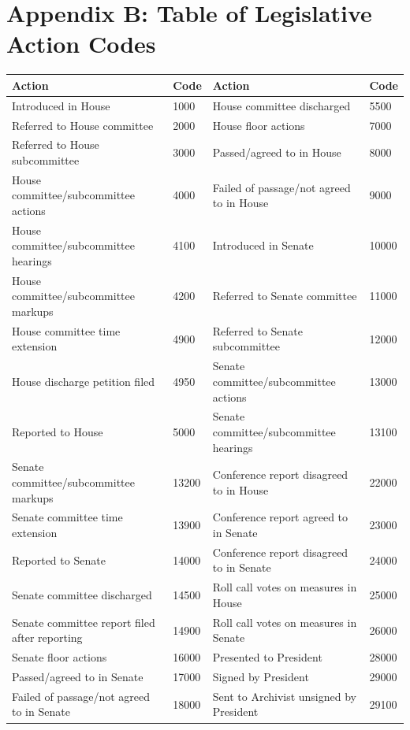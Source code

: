 \documentclass[letterpaper,11pt]{article}
\begin{document}
\clearpage

\section*{Appendix B: Table of Legislative Action Codes}\label{appendix:B}

\begin{table}[!h]
\centering
\footnotesize
\begin{tabular}{llll}
\hline
\textbf{Action} & \textbf{Code} & \textbf{Action} & \textbf{Code} \\
\hline
Introduced in House & 1000 & House committee discharged & 5500 \\
Referred to House committee & 2000 & House floor actions & 7000 \\
Referred to House subcommittee & 3000 & Passed/agreed to in House & 8000 \\
House committee/subcommittee actions & 4000 & Failed of passage/not agreed to in House & 9000 \\
House committee/subcommittee hearings & 4100 & Introduced in Senate & 10000 \\
House committee/subcommittee markups & 4200 & Referred to Senate committee & 11000 \\
House committee time extension & 4900 & Referred to Senate subcommittee & 12000 \\
House discharge petition filed & 4950 & Senate committee/subcommittee actions & 13000 \\
Reported to House & 5000 & Senate committee/subcommittee hearings & 13100 \\
Senate committee/subcommittee markups & 13200 & Conference report disagreed to in House & 22000 \\
Senate committee time extension & 13900 & Conference report agreed to in Senate & 23000 \\
Reported to Senate & 14000 & Conference report disagreed to in Senate & 24000 \\
Senate committee discharged & 14500 & Roll call votes on measures in House & 25000 \\
Senate committee report filed after reporting & 14900 & Roll call votes on measures in Senate & 26000 \\
Senate floor actions & 16000 & Presented to President & 28000 \\
Passed/agreed to in Senate & 17000 & Signed by President & 29000 \\
Failed of passage/not agreed to in Senate & 18000 & Sent to Archivist unsigned by President & 29100 \\

\end{tabular}
\end{table}
\end{document}
